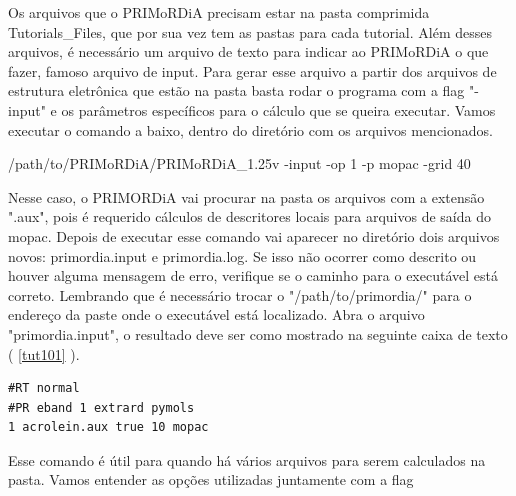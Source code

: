 \documentclass[a4paper,11pt]{refart}
\begin{document}
Os arquivos que o PRIMoRDiA precisam estar na pasta comprimida Tutorials\_Files, que por sua vez tem as pastas para cada tutorial. Além desses arquivos, é necessário um arquivo de texto para indicar ao PRIMoRDiA o que fazer, famoso arquivo de input. Para gerar esse arquivo a partir dos arquivos de estrutura eletrônica que estão na pasta basta rodar o programa com a flag "-input" e os parâmetros específicos para o cálculo que se queira executar. Vamos executar o comando a baixo, dentro do diretório com os arquivos mencionados.

\hspace*{-\leftmarginwidth}
\begin{minipage}{\fullwidth}
\begin{commandshell}/path/to/PRIMoRDiA/PRIMoRDiA_1.25v -input -op 1 -p mopac -grid 40\end{commandshell}
\end{minipage}

Nesse caso, o PRIMORDiA vai procurar na pasta os arquivos com a extensão ".aux", pois é requerido cálculos de descritores locais para arquivos de saída do mopac. Depois de executar esse comando vai aparecer no diretório dois arquivos novos: primordia.input e primordia.log. Se isso não ocorrer como descrito ou houver alguma mensagem de erro, verifique se o caminho para o executável está correto. Lembrando que é necessário trocar o "/path/to/primordia/" para o endereço da paste onde o executável está localizado. Abra o arquivo "primordia.input", o resultado deve ser como mostrado na seguinte caixa de texto ( \autoref{tut101} ).

\begin{minipage}{\textwidth}
\begin{lstlisting}[caption={Input gerado pelo comando do PRIMoRDiA.},label={tut101}]
#RT normal 
#PR eband 1 extrard pymols
1 acrolein.aux true 10 mopac 
\end{lstlisting}
\end{minipage}


Esse comando é útil para quando há vários arquivos para serem calculados na pasta. Vamos entender as opções utilizadas juntamente com a flag
\end{document}
